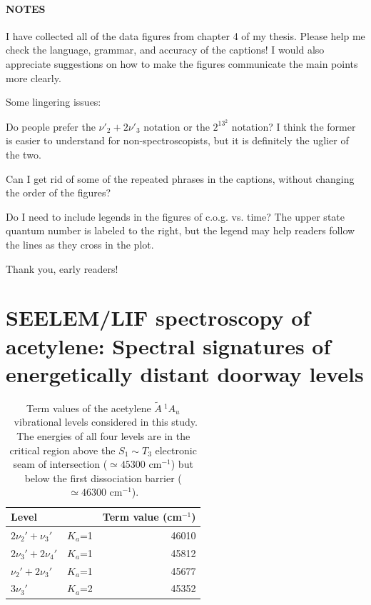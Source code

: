 \documentclass[12pt]{mitthesis}
\newcommand{\rcm}{cm$^{-1}$}
\newcommand{\astate}{$
  \tilde{A} \: ^1\!A_u
  $}
\begin{document}
\listoffigures
\clearpage

\listoftables
\clearpage
\subsubsection*{NOTES}
I have collected all of the data figures from chapter 4 of my thesis.
Please help me check the language, grammar, and accuracy of the
captions!  I would also appreciate suggestions on how to make the
figures communicate the main points more clearly.

Some lingering issues:

Do people prefer the $\nu'_2+2\nu'_3$ notation or the $2^13^2$
notation?  I think the former is easier to understand for
non-spectroscopists, but it is definitely the uglier of the two.

Can I get rid of some of the repeated phrases in the captions, without
changing the order of the figures?

Do I need to include legends in the figures of c.o.g. vs. time?  The
upper state quantum number is labeled to the right, but the legend may
help readers follow the lines as they cross in the plot.

Thank you, early readers!
\clearpage

\setcounter{chapter}{3}
\chapter{SEELEM/LIF spectroscopy of acetylene: Spectral signatures of
  energetically distant doorway levels}

\begin{table}
  \caption{Term values of the acetylene \astate\ vibrational levels considered in
    this study.  The energies of all four levels are in the critical
    region above the $S_1 \sim T_3$ electronic seam of intersection
    ($\simeq 45300$ \rcm) but below the first dissociation barrier
    ($\simeq 46300$ \rcm).}
  \label{table:termvals}
  \centering
  \begin{tabular}{llr}
    Level & & Term value (\rcm ) \\
    \midrule
    $2\nu_2' +  \nu_3'$ & $K_a$=1 & 46010 \\
    $2\nu_3' + 2\nu_4'$ & $K_a$=1 & 45812 \\
    $ \nu_2' + 2\nu_3'$ & $K_a$=1 & 45677 \\
    $3\nu_3'          $ & $K_a$=2 & 45352 \\
  \end{tabular}
\end{table}
\end{document}
